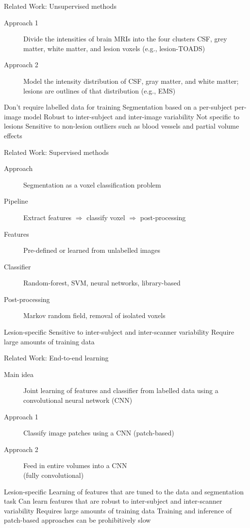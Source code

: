 \documentclass{beamer}
\begin{document}
\begin{frame}{Related Work: Unsupervised methods}
\begin{description}
\item[Approach 1] 
Divide the intensities of brain MRIs into the four clusters
CSF, grey matter, white matter, and lesion voxels (e.g., lesion-TOADS)
\item[Approach 2] Model the intensity distribution of CSF, gray matter, and
white matter; lesions are outlines of that distribution (e.g., EMS)
\end{description}
\begin{itemize}
 Don't require labelled data for training
 Segmentation based on a per-subject per-image model
 Robust to inter-subject and inter-image variability
 Not specific to lesions
 Sensitive to non-lesion outliers such as blood vessels and partial
volume effects
\end{itemize}
\end{frame}

\begin{frame}{Related Work: Supervised methods}
\begin{description}
\item[Approach] Segmentation as a voxel classification problem
\item[Pipeline] Extract features $\Rightarrow$ classify voxel $\Rightarrow$
post-processing
\item[Features] Pre-defined or learned from unlabelled images
\item[Classifier] Random-forest, SVM, neural networks, library-based
\item[Post-processing] Markov random field, removal of isolated voxels
\end{description}
\begin{itemize}
 Lesion-specific
 Sensitive to inter-subject and inter-scanner variability
 Require large amounts of training data
\end{itemize}
\end{frame}

\begin{frame}{Related Work: End-to-end learning}
\begin{description}
\item[Main idea] Joint learning of features and classifier from labelled data
using a convolutional neural network (CNN)
\item[Approach 1] Classify image patches using a CNN (patch-based)
\item[Approach 2] Feed in entire volumes into a CNN\\ (fully convolutional)
\end{description}
\begin{itemize}
 Lesion-specific
 Learning of features that are tuned to the data and segmentation
task
 Can learn features that are robust to inter-subject and inter-scanner
variability
 Requires large amounts of training data
 Training and inference of patch-based approaches can be prohibitively
slow
\end{itemize}
\end{frame}
\end{document}

